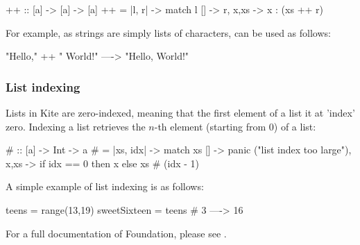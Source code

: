 \begin{kite}
{++} :: [a] -> [a] -> [a]
{++} = |l, r| -> {
  match l {
    [] -> r,
    x,xs -> x : (xs ++ r)
  }
}
\end{kite}

For example, as strings are simply lists of characters, \code{++} can be used as follows:

\begin{kite}
"Hello," ++ " World!" ----> "Hello, World!"
\end{kite}

\subsubsection{List indexing}
Lists in Kite are zero-indexed, meaning that the first element of a list it at 'index' zero. Indexing a list retrieves the $n$-th element (starting from 0) of a list:

\begin{kite}
{#} :: [a] -> Int -> a
{#} = |xs, idx| -> {
  match xs {
    [] -> panic ("list index too large"),
    x,xs -> if idx == 0 then x else xs # (idx - 1)
  }
}
\end{kite}

A simple example of list indexing is as follows:

\begin{kite}
teens = range(13,19)
sweetSixteen = teens # 3 ----> 16
\end{kite}

For a full documentation of Foundation, please see
.


